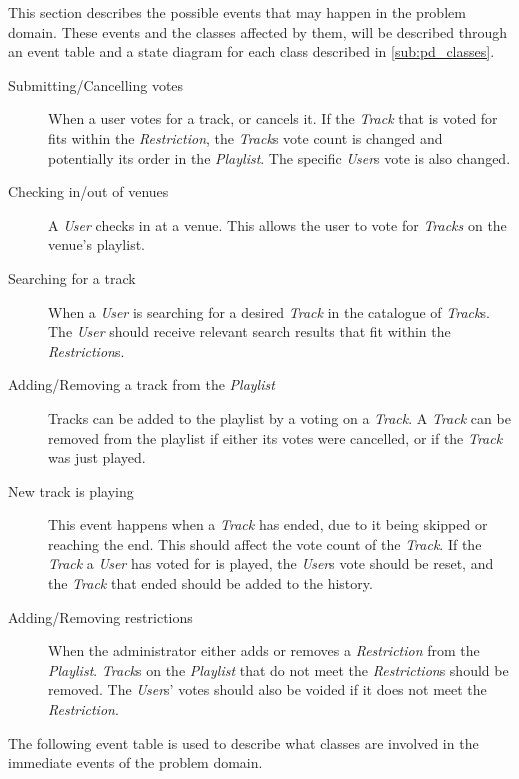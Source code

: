 This section describes the possible events that may happen in the
problem domain. These events and the classes affected by them, will be
described through an event table and a state diagram for each class
described in \cref{sub:pd_classes}.

\begin{description}

\item[Submitting/Cancelling votes]
    When a user votes for a track, or cancels it. If the \emph{Track} that is voted for fits within the \emph{Restriction}, the \emph{Track}s vote count is changed and potentially its order in the \emph{Playlist}. The specific \emph{User}s vote is also changed.

\item[Checking in/out of venues]
    A \emph{User} checks in at a venue. This allows the user to vote
    for \emph{Tracks} on the venue's playlist.

\item[Searching for a track]
    When a \emph{User} is searching for a desired \emph{Track} in the catalogue of \emph{Track}s. The \emph{User} should receive relevant search results that fit within the \emph{Restriction}s.

\item[Adding/Removing a track from the \emph{Playlist}]
    Tracks can be added to the playlist by a  voting on a
    \emph{Track}. A \emph{Track} can be removed from the playlist if
    either its votes were cancelled, or if the \emph{Track} was just played.

\item[New track is playing]
    This event happens when a \emph{Track} has ended, due to it being skipped or
    reaching the end. This should affect the vote count of the
    \emph{Track}. If the \emph{Track} a \emph{User} has voted
    for is played, the \emph{User}s vote should be reset, and the
    \emph{Track} that ended should be added to the history.

\item[Adding/Removing restrictions]
    When the administrator either adds or removes a \emph{Restriction} from the \emph{Playlist}. \emph{Track}s on the \emph{Playlist} that do not meet the \emph{Restriction}s should be removed. The \emph{User}s' votes should also be voided if it does not meet the \emph{Restriction}.

\end{description}

The following event table is used to describe what classes are involved in the immediate events of the problem domain.


